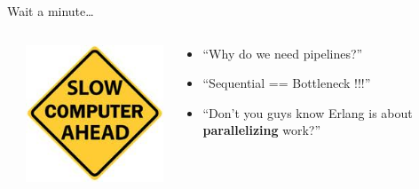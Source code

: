\documentclass[aspectratio=169]{beamer}
\begin{document}
\begin{frame}{Wait a minute\dots}
    \begin{columns}
        \begin{column}[c]{0.05\textwidth}
        \end{column}
        \begin{column}[c]{0.3\textwidth}
            \includegraphics[width=\textwidth]{images/slow.png}
        \end{column}
        \begin{column}[c]{0.65\textwidth}
            \begin{itemize}
                \item ``Why do we need pipelines?''
                \item ``Sequential == Bottleneck !!!''
                \item ``Don't you guys know Erlang is about \textbf{parallelizing} work?''
            \end{itemize}
        \end{column}
    \end{columns}
\end{frame}
\end{document}
